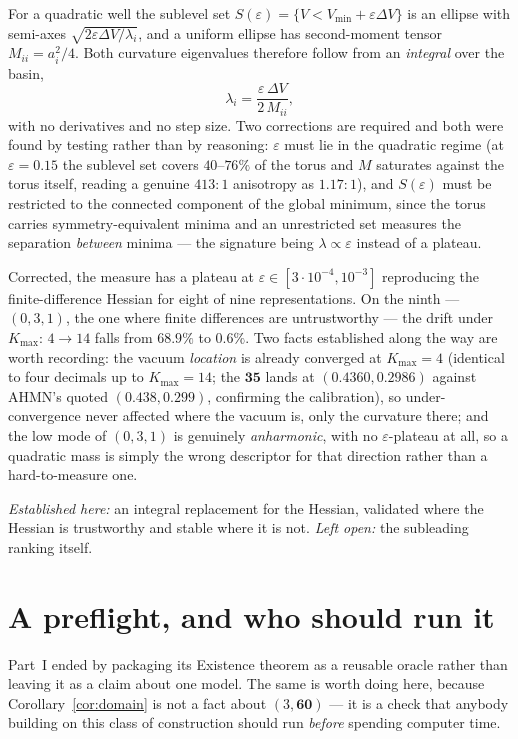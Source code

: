 \documentclass[11pt,a4paper]{article}
\begin{document}
For a quadratic well the sublevel set $S(\varepsilon)=\{V<V_{\min}+\varepsilon\Delta V\}$ is
an ellipse with semi-axes $\sqrt{2\varepsilon\Delta V/\lambda_i}$, and a uniform ellipse has
second-moment tensor $M_{ii}=a_i^2/4$. Both curvature eigenvalues therefore follow from an
\emph{integral} over the basin,
\begin{equation}
\lambda_i=\frac{\varepsilon\,\Delta V}{2\,M_{ii}},
\end{equation}
with no derivatives and no step size. Two corrections are required and both were found by
testing rather than by reasoning: $\varepsilon$ must lie in the quadratic regime (at
$\varepsilon=0.15$ the sublevel set covers $40$--$76\%$ of the torus and $M$ saturates
against the torus itself, reading a genuine $413{:}1$ anisotropy as $1.17{:}1$), and
$S(\varepsilon)$ must be restricted to the connected component of the global minimum, since
the torus carries symmetry-equivalent minima and an unrestricted set measures the separation
\emph{between} minima --- the signature being $\lambda\propto\varepsilon$ instead of a
plateau.

Corrected, the measure has a plateau at $\varepsilon\in[3\cdot10^{-4},10^{-3}]$ reproducing
the finite-difference Hessian for eight of nine representations. On the ninth ---
$(0,3,1)$, the one where finite differences are untrustworthy --- the drift under
$K_{\max}\!:\,4\to14$ falls from $68.9\%$ to $0.6\%$. Two facts established along the way are
worth recording: the vacuum \emph{location} is already converged at $K_{\max}=4$ (identical
to four decimals up to $K_{\max}=14$; the $\mathbf{35}$ lands at $(0.4360,0.2986)$ against
AHMN's quoted $(0.438,0.299)$, confirming the calibration), so under-convergence never
affected where the vacuum is, only the curvature there; and the low mode of $(0,3,1)$ is
genuinely \emph{anharmonic}, with no $\varepsilon$-plateau at all, so a quadratic mass is
simply the wrong descriptor for that direction rather than a hard-to-measure one.

\emph{Established here:} an integral replacement for the Hessian, validated where the Hessian
is trustworthy and stable where it is not. \emph{Left open:} the subleading ranking itself.

\section{A preflight, and who should run it}\label{sec:tool}
Part~I ended by packaging its Existence theorem as a reusable oracle rather than leaving it
as a claim about one model. The same is worth doing here, because
Corollary~\ref{cor:domain} is not a fact about $(3,\mathbf{60})$ --- it is a check that
anybody building on this class of construction should run \emph{before} spending computer
time.
\end{document}

